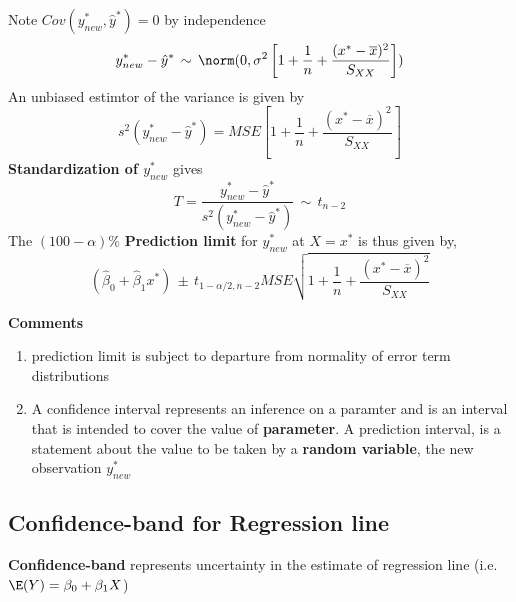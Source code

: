 \documentclass[11pt]{article}
\begin{document}
\begin{defn*}
\[    \]
    Note $Cov(y^*_{new}, \hat{y}^*) = 0$ by independence
    \[
        y^*_{new} - \hat{y}^* \, \sim \, \norm(0, \sigma^2 \left[ 1+ \frac{1}{n} +\frac{(x^* - \overline{x})^2}{S_{XX}} \right])
    \]
    An unbiased estimtor of the variance is given by 
    \[
        s^2(y^*_{new} - \hat{y}^*) = MSE \left[ 1+ \frac{1}{n} +\frac{(x^* - \overline{x})^2}{S_{XX}} \right]
    \]
    \textbf{Standardization of $y^*_{new}$} gives 
    \[
        T = \frac{y^*_{new} - \hat{y}^*}{s^2(y^*_{new} - \hat{y}^*)} \, \sim \, t_{n-2}
    \]
    The $(100-\alpha)\%$ \textbf{Prediction limit} for $y^*_{new}$ at $X=x^*$ is thus given by,
    \[
        (\hat{\beta}_0 + \hat{\beta}_1 x^*) \, \pm \, t_{1-\alpha/2, n-2} MSE \sqrt{1+ \frac{1}{n} +\frac{(x^* - \overline{x})^2}{S_{XX}} } 
    \]
\end{defn*}

\begin{defn*}
    \textbf{Comments}
    \begin{enumerate}
        \item prediction limit is subject to departure from normality of error term distributions
        \item A confidence interval represents an inference on a paramter and is an interval that is intended to cover the value of \textbf{parameter}. A prediction interval, is a statement about the value to be taken by a \textbf{random variable}, the new observation $y^*_{new}$
    \end{enumerate}
\end{defn*}
 

\subsection*{Confidence-band for Regression line} 

\begin{defn*}
    \textbf{Confidence-band} represents uncertainty in the estimate of regression line (i.e. $\E(Y) = \beta_0 + \beta_1 X$)
    
\end{defn*}
\end{document}
